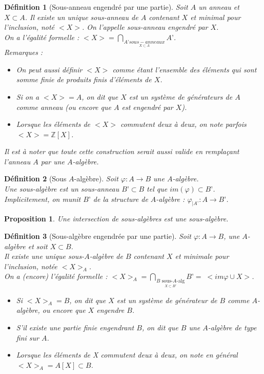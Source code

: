 \documentclass{article}           %
\newcommand\Z{\mathbb{Z}}
\newcommand\capp[2]{\underset{#1}{\overset{#2}{\bigcap}}} 	%
\theoremstyle{break}
\theoremstyle{add}
\theoremstyle{break} %
\newtheorem{definition}{Définition}[section]
\newtheorem{proposition}{Proposition}[section]
\theoremstyle{add}
\begin{document}
\begin{definition}[Sous-anneau engendré par une partie]
Soit $A$ un anneau et $X \subset A$. Il existe un unique sous-anneau de $A$ contenant $X$ et minimal pour l’inclusion, noté $<X>$. On l’appelle \textit{sous-anneau engendré} par $X$. \\
On a l’égalité formelle : $<X> = \capp{\underset{X \subset A}{A’ sous-anneaux}}{} A’$. \\

\textit{Remarques :}
\begin{itemize}
\item On peut aussi définir $<X>$ comme étant l’ensemble des éléments qui sont somme finie de produits finis d’éléments de $X$.
\item Si on a $<X> = A$, on dit que $X$ est un système de générateurs de $A$ comme anneau (ou encore que $A$ est engendré par $X$).
\item Lorsque les éléments de $<X>$ commutent deux à deux, on note parfois $<X> = \Z[X]$.
\end{itemize}

Il est à noter que toute cette construction serait aussi valide en remplaçant l’anneau $A$ par une $A$-algèbre.
\end{definition}

\begin{definition}[Sous $A$-algèbre]
Soit $\varphi : A \rightarrow B$ une $A$-algèbre.\\
Une sous-algèbre est un sous-anneau $B’ \subset B$ tel que $im(\varphi) \subset B’$. \\
Implicitement, on munit $B’$ de la structure de $A$-algèbre : $\varphi_{|A’} : A \rightarrow B’$.
\end{definition}

\begin{proposition}
Une intersection de sous-algèbres est une sous-algèbre.
\end{proposition}

\begin{definition}[Sous-algèbre engendrée par une partie]
Soit $\varphi : A \rightarrow B$, une $A$-algèbre et soit $X \subset B$. \\
Il existe une unique sous-$A$-algèbre de $B$ contenant $X$ et minimale pour l’inclusion, notée $<X>_A$. \\
On a (encore) l’égalité formelle : $<X>_A = \capp{\underset{X \subset B'}{B \textrm{ sous-$A$-alg}}}{} B’ = \; <im \varphi \cup X>$. \\  

\begin{itemize}
\item Si $<X>_A = B$, on dit que $X$ est un système de générateur de $B$ comme $A$-algèbre, ou encore que $X$ engendre $B$.
\item S’il existe une partie finie engendrant $B$, on dit que $B$ une $A$-algèbre de type fini sur $A$.
\item Lorsque les éléments de X commutent deux à deux, on note en général $<X>_A = A[X] \subset B$.
\end{itemize}
\end{definition}
\end{document}
